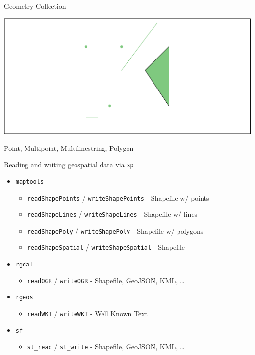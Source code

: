 \documentclass[11pt,ignorenonframetext,]{beamer}
\providecommand{\tightlist}{%
  \setlength{\itemsep}{0pt}\setlength{\parskip}{0pt}}
\begin{document}
\begin{frame}{Geometry Collection}

\begin{center}\includegraphics{Lec16_files/figure-beamer/unnamed-chunk-2-1} \end{center}

Point, Multipoint, Multilinestring, Polygon

\end{frame}

\begin{frame}[fragile]{Reading and writing geospatial data via
\texttt{sp}}

\begin{itemize}
\tightlist
\item
  \texttt{maptools}

  \begin{itemize}
  \tightlist
  \item
    \texttt{readShapePoints} / \texttt{writeShapePoints} - Shapefile w/
    points
  \item
    \texttt{readShapeLines} / \texttt{writeShapeLines} - Shapefile w/
    lines
  \item
    \texttt{readShapePoly} / \texttt{writeShapePoly} - Shapefile w/
    polygons
  \item
    \texttt{readShapeSpatial} / \texttt{writeShapeSpatial} - Shapefile
  \end{itemize}
\item
  \texttt{rgdal}

  \begin{itemize}
  \tightlist
  \item
    \texttt{readOGR} / \texttt{writeOGR} - Shapefile, GeoJSON, KML,
    \ldots{}
  \end{itemize}
\item
  \texttt{rgeos}

  \begin{itemize}
  \tightlist
  \item
    \texttt{readWKT} / \texttt{writeWKT} - Well Known Text
  \end{itemize}
\item
  \texttt{sf}

  \begin{itemize}
  \tightlist
  \item
    \texttt{st\_read} / \texttt{st\_write} - Shapefile, GeoJSON, KML,
    \ldots{}
  \end{itemize}
\end{itemize}

\end{frame}
\end{document}
